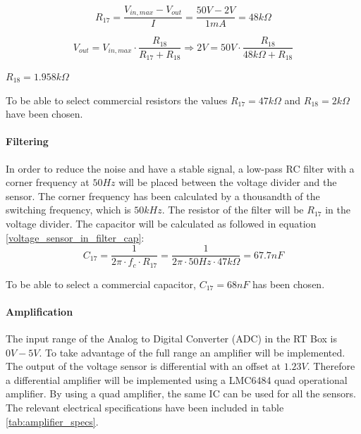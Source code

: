 \begin{equation} \label{voltage_divider_R17_in}
	R_{17} = \frac{V_{in,max}-V_{out}}{I} = \frac{50V-2V}{1mA} = 48k\Omega
\end{equation}

\begin{equation} \label{voltage_divider_R18_in}
	V_{out} = V_{in,max} \cdot \frac{R_{18}}{R_{17}+R_{18}} \Rightarrow 2V = 50V \cdot \frac{R_{18}}{48k\Omega+R_{18}}
\end{equation}
\begin{center}
	$R_{18} = 1.958k\Omega$
\end{center}

To be able to select commercial resistors the values $R_{17} = 47k\Omega$ and $R_{18} = 2k\Omega$ have been chosen. 

\paragraph{Filtering} \label{voltage_sensor_filter}
In order to reduce the noise and have a stable signal, a low-pass RC filter with a corner frequency at $50Hz$ will be placed between the voltage divider and the sensor. The corner frequency has been calculated by a thousandth of the switching frequency, which is $50 kHz$. The resistor of the filter will be $R_{17}$ in the voltage divider. The capacitor will be calculated as followed in equation \ref{voltage_sensor_in_filter_cap}:
\begin{equation} \label{voltage_sensor_in_filter_cap}
	C_{17} = \frac{1}{2\pi \cdot f_c \cdot R_{17}} = \frac{1}{2 \pi \cdot 50Hz \cdot 47k\Omega} = 67.7nF
\end{equation}

\noindent To be able to select a commercial capacitor, $C_{17} = 68nF$ has been chosen. 

\paragraph{Amplification} \label{voltage_sensor_amplification}
The input range of the Analog to Digital Converter (ADC) in the RT Box is $0V-5V$. To take advantage of the full range an amplifier will be implemented. The output of the voltage sensor is differential with an offset at $1.23V$. Therefore a differential amplifier will be implemented using a LMC6484 \cite{sensor_opamp}  quad operational amplifier. By using a quad amplifier, the same IC can be used for all the sensors. The relevant electrical specifications have been included in table \ref{tab:amplifier_specs}.


